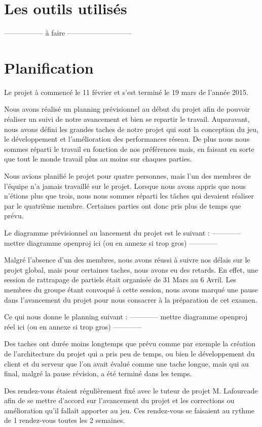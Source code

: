 \section{Les outils utilisés}

----------------- à faire  ---------------------------






\section{Planification}

Le projet à commencé le 11 février et s'est terminé le 19 mars de l'année 2015.

Nous avons réalisé un planning prévisionnel au début du projet afin de pouvoir réaliser un suivi de notre avancement et bien se repartir le travail. Auparavant, nous avons défini les grandes taches de notre projet qui sont la conception du jeu, le développement et l'amélioration des performances réseau. De plus nous nous sommes réparti le travail en fonction de nos préférences mais, en faisant en sorte que tout le monde travail plus au moins sur chaques parties.

Nous avions planifié le projet pour quatre personnes, mais l'un des membres de l'équipe n'a jamais travaillé sur le projet. Lorsque nous avons appris que nous n'étions plus que trois, nous nous sommes réparti les tâches qui devaient réaliser par le quatrième membre. Certaines parties ont donc pris plus de temps que prévu.

Le diagramme prévisionnel au lancement du projet est le suivant :
------------
mettre diagramme openproj ici (ou en annexe si trop gros)
------------

Malgré l'absence d'un des membres, nous avons réussi à suivre nos délais sur le projet global, mais pour certaines taches, nous avons eu des retards. En effet, une session de rattrapage de partiels était organisée de 31 Mars au 6 Avril. Les membres du groupe étant convoqué à cette session, nous avons marqué une pause dans l'avancement du projet pour nous consacrer à la préparation de cet examen.

Ce qui nous donne le planning suivant :
------------
mettre diagramme openproj réel ici (ou en annexe si trop gros)
------------

Des taches ont durée moins longtemps que prévu comme par exemple la création de l'architecture du projet qui a pris peu de temps, ou bien le développement du client et du serveur que l'on avait évalué comme une tache longue, mais qui au final, malgré la pause révision, a été terminé dans les temps.

Des rendez-vous étaient régulièrement fixé avec le tuteur de projet M. Lafourcade afin de se mettre d'accord sur l'avancement du projet et les corrections ou amélioration qu'il fallait apporter au jeu. Ces rendez-vous se faisaient au rythme de 1 rendez-vous toutes les 2 semaines.